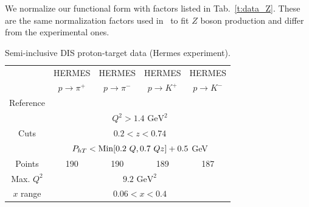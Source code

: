 \documentclass[aps,preprintnumbers,showpacs,nofootinbib,superscriptaddress,floatfix]{revtex4}
\newcommand{\Tperp}{T}
\begin{document}
We normalize our functional form with factors listed in Tab.~\ref{t:data_Z}. These are the same normalization factors used in~\cite{DAlesio:2014mrz} to fit $Z$ boson production and differ from the experimental ones. 



\renewcommand{\tabcolsep}{0.4pc} %
\renewcommand{\arraystretch}{1.3} %

\begin{table}[h!]
\begin{center}
\begin{tabular}{|c|c|c|c|c|}
 \hline
  & HERMES & HERMES & HERMES & HERMES \\
 ~          &  $p \to \pi^+$    &   $p \to \pi^-$    &  $p \to K^+$    &   $p \to K^-$               \\
 \hline
 Reference & \multicolumn{4}{c|}{\cite{Airapetian:2012ki}}        \\
\hline
\multirow{3}{*}{Cuts}             & \multicolumn{4}{c|}{$Q^2 > 1.4 \text{ GeV}^2$}     \\
             & \multicolumn{4}{c|}{$0.2 <z <0.74$}     \\
             & \multicolumn{4}{c|}{$P_{h \Tperp}< {\rm Min}[0.2\ Q, 0.7 \ Q z ] +0.5$ GeV}     \\
\hline
 Points         &  190 & 190 & 189 & 187       \\
 \hline
Max. $Q^2$      &  \multicolumn{4}{c|}{$9.2 \text{ GeV}^2 $}               \\
 \hline
$x$ range       & \multicolumn{4}{c|}{$0.06 < x < 0.4$ }                \\
\hline
\end{tabular}
\caption{Semi-inclusive DIS proton-target data (Hermes experiment).}
\label{t:data_SIDIS_proton}
\end{center}
\end{table}
\end{document}
